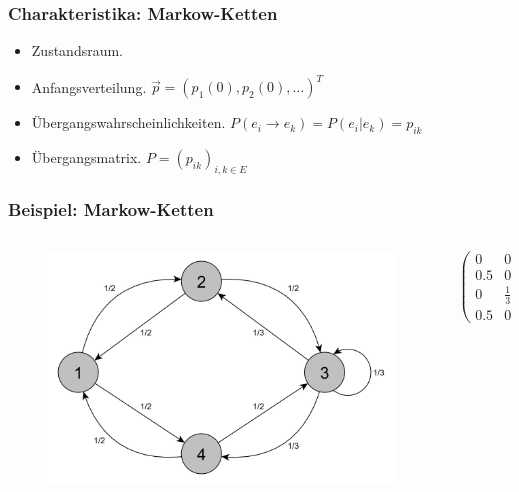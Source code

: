 \documentclass[aspectratio=169,xcolor=dvipsnames]{beamer}
\begin{document}
\begin{frame}
\frametitle{Charakteristika: Markow-Ketten}
\begin{itemize}
	\item<1-> Zustandsraum.
	\item<2-> Anfangsverteilung. $\overset{\rightarrow}{p}=(p_1 (0),p_2 (0),\dots)^T$
	\item<3-> Übergangswahrscheinlichkeiten. \(P(e_i \rightarrow e_k)=P(e_i \vert e_k)=p_{ik}\)
	\item<4-> Übergangsmatrix. \(P=(p_{ik})_{i,k\in E}\)
\end{itemize}
\end{frame}

\begin{frame}
\frametitle{Beispiel: Markow-Ketten}
\begin{columns}
\begin{column}{0.5\textwidth}
\begin{center}
\begin{figure}
\includegraphics[width=1\textwidth]{Markov_Chain_Probabilities}
\end{figure}
\end{center}
\end{column}
\begin{column}{0.5\textwidth}
$$\left(
   \begin{array}{cccc}
     0 & 0.5 & 0 & 0.5 \\
     0.5 & 0 & 0.5 & 0 \\
     0 & \frac{1}{3} & \frac{1}{3} & \frac{1}{3} \\
     0.5 & 0 & 0.5 & 0
   \end{array}
\right)$$
\end{column}
\end{columns}
\end{frame}
\end{document}
